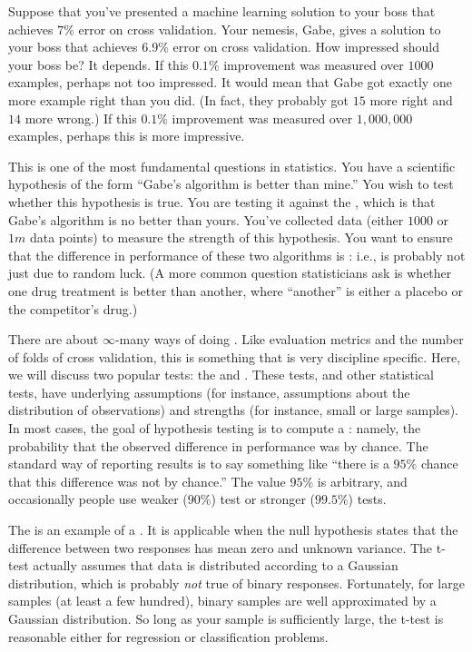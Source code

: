 Suppose that you've presented a machine learning solution to your boss
that achieves $7\%$ error on cross validation.  Your nemesis, Gabe,
gives a solution to your boss that achieves $6.9\%$ error on cross
validation.  How impressed should your boss be?  It depends.  If this
$0.1\%$ improvement was measured over $1000$ examples, perhaps not too
impressed.  It would mean that Gabe got exactly one more example right
than you did.  (In fact, they probably got $15$ more right and $14$ more
wrong.)  If this $0.1\%$ improvement was measured over $1,000,000$
examples, perhaps this is more impressive.

This is one of the most fundamental questions in statistics.  You have
a scientific hypothesis of the form ``Gabe's algorithm is better than
mine.''  You wish to test whether this hypothesis is true.  You are
testing it against the , which is that Gabe's
algorithm is no better than yours.  You've collected data (either
$1000$ or $1m$ data points) to measure the strength of this
hypothesis.  You want to ensure that the difference in performance of
these two algorithms is : i.e., is
probably not just due to random luck.  (A more common question
statisticians ask is whether one drug treatment is better than
another, where ``another'' is either a placebo or the competitor's
drug.)

There are about $\infty$-many ways of doing .  Like evaluation metrics and the number of folds of cross
validation, this is something that is very discipline specific.  Here,
we will discuss two popular tests: the  and
.  These tests, and other statistical tests,
have underlying assumptions (for instance, assumptions about the
distribution of observations) and strengths (for instance, small or
large samples).  In most cases, the goal of hypothesis testing is to
compute a : namely, the probability that the observed
difference in performance was by chance.  The standard way of
reporting results is to say something like ``there is a $95\%$ chance
that this difference was not by chance.''  The value $95\%$ is
arbitrary, and occasionally people use weaker ($90\%$) test or
stronger ($99.5\%$) tests.

The  is an example of a .  It
is applicable when the null hypothesis states that the difference
between two responses has mean zero and unknown variance.  The t-test
actually assumes that data is distributed according to a Gaussian
distribution, which is probably \emph{not} true of binary responses.
Fortunately, for large samples (at least a few hundred), binary
samples are well approximated by a Gaussian distribution.  So long as
your sample is sufficiently large, the t-test is reasonable either for
regression or classification problems.

